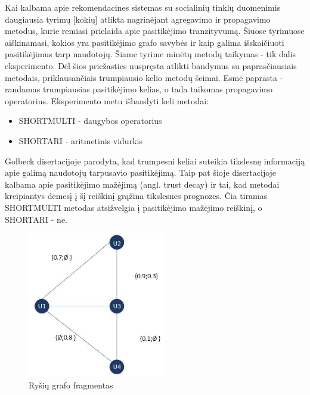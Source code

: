 \documentclass{VUMIFInfMagistrinis}
\begin{document}
\indent
Kai kalbama apie rekomendacines sistemas su socialinių tinklų duomenimis daugiausia tyrimų [kokių] atlikta nagrinėjant agregavimo ir propagavimo metodus, kurie remiasi prielaida apie pasitikėjimo tranzityvumą. Šiuose tyrimuose aiškinamasi, kokios yra pasitikėjimo grafo savybės ir kaip galima išskaičiuoti pasitikėjimus tarp naudotojų. Šiame tyrime minėtų metodų taikymas - tik dalis eksperimento. Dėl šios priežasties nuspręsta atlikti bandymus su paprasčiausiais metodais, priklausančiais trumpiausio kelio metodų šeimai. Esmė paprasta - randamas trumpiausias pasitikėjimo kelias, o tada taikomas propagavimo operatorius. Eksperimento metu išbandyti keli metodai:
\begin{itemize}
	\item SHORTMULTI - daugybos operatorius
	\item SHORTARI - aritmetinis vidurkis
\end{itemize}
\indent 
Golbeck disertacijoje parodyta, kad trumpesni keliai suteikia tikslesnę informaciją apie galimą naudotojų tarpusavio pasitikėjimą. Taip pat šioje disertacijoje kalbama apie pasitikėjimo mažėjimą (angl. trust decay) ir tai, kad metodai kreipiantys dėmesį į šį reiškinį grąžina tikslesnes prognozes. Čia tiramas SHORTMULTI metodas atsižvelgia į pasitikėjimo mažėjimo reiškinį, o SHORTARI - ne.
\begin{figure}[ht!]
	\centering
	\includegraphics[width=60mm]{multiarea.jpg}
	\caption{Ryšių grafo fragmentas} \label{multiarea}
\end{figure}
\end{document}
